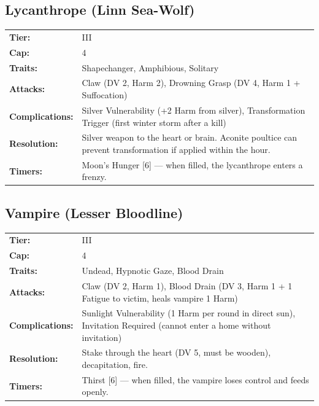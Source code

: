\subsection{Lycanthrope (Linn Sea-Wolf)}
\begin{tabular}{@{}ll}
\textbf{Tier:} & III \\
\textbf{Cap:} & 4 \\
\textbf{Traits:} & Shapechanger, Amphibious, Solitary \\
\textbf{Attacks:} & Claw (DV 2, Harm 2), Drowning Grasp (DV 4, Harm 1 + Suffocation) \\
\textbf{Complications:} & Silver Vulnerability (+2 Harm from silver), Transformation Trigger (first winter storm after a kill) \\
\textbf{Resolution:} & Silver weapon to the heart or brain. Aconite poultice can prevent transformation if applied within the hour. \\
\textbf{Timers:} & Moon's Hunger [6] --- when filled, the lycanthrope enters a frenzy. \\
\end{tabular}

\subsection{Vampire (Lesser Bloodline)}
\begin{tabular}{@{}ll}
\textbf{Tier:} & III \\
\textbf{Cap:} & 4 \\
\textbf{Traits:} & Undead, Hypnotic Gaze, Blood Drain \\
\textbf{Attacks:} & Claw (DV 2, Harm 1), Blood Drain (DV 3, Harm 1 + 1 Fatigue to victim, heals vampire 1 Harm) \\
\textbf{Complications:} & Sunlight Vulnerability (1 Harm per round in direct sun), Invitation Required (cannot enter a home without invitation) \\
\textbf{Resolution:} & Stake through the heart (DV 5, must be wooden), decapitation, fire. \\
\textbf{Timers:} & Thirst [6] --- when filled, the vampire loses control and feeds openly. \\
\end{tabular}

